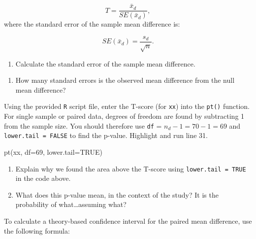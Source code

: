 \documentclass[
]{report}
\newenvironment{Shaded}{\begin{snugshade}}{\end{snugshade}}
\newcommand{\AttributeTok}[1]{\textcolor[rgb]{0.77,0.63,0.00}{#1}}
\newcommand{\ConstantTok}[1]{\textcolor[rgb]{0.00,0.00,0.00}{#1}}
\newcommand{\DecValTok}[1]{\textcolor[rgb]{0.00,0.00,0.81}{#1}}
\newcommand{\FunctionTok}[1]{\textcolor[rgb]{0.00,0.00,0.00}{#1}}
\newcommand{\NormalTok}[1]{#1}
\providecommand{\tightlist}{%
  \setlength{\itemsep}{0pt}\setlength{\parskip}{0pt}}
\begin{document}
\[T = \frac{\bar{x}_d}{SE(\bar{x}_d)},\]
\newpage
where the standard error of the sample mean difference is:

\[SE(\bar{x}_d)=\frac{s_d}{\sqrt{n}}.\]

\begin{enumerate}
\def\labelenumi{\arabic{enumi}.}
\setcounter{enumi}{6}
\tightlist
\item
  Calculate the standard error of the sample mean difference.
\end{enumerate}

\vspace{0.5in}

\begin{enumerate}
\def\labelenumi{\arabic{enumi}.}
\setcounter{enumi}{7}
\tightlist
\item
  How many standard errors is the observed mean difference from the null mean difference?
\end{enumerate}

\vspace{0.5in}

Using the provided \texttt{R} script file, enter the T-score (for \texttt{xx}) into the \texttt{pt()} function. For single sample or paired data, degrees of freedom are found by subtracting 1 from the sample size. You should therefore use \texttt{df} = \(n_d-1 = 70 - 1 = 69\) and \texttt{lower.tail\ =\ FALSE} to find the p-value. Highlight and run line 31.

\begin{Shaded}
\begin{Highlighting}[]
\FunctionTok{pt}\NormalTok{(xx, }\AttributeTok{df=}\DecValTok{69}\NormalTok{, }\AttributeTok{lower.tail=}\ConstantTok{TRUE}\NormalTok{)}
\end{Highlighting}
\end{Shaded}

\begin{enumerate}
\def\labelenumi{\arabic{enumi}.}
\setcounter{enumi}{8}
\item
  Explain why we found the area above the T-score using \texttt{lower.tail\ =\ TRUE} in the code above.
  \vspace{0.3in}
\item
  What does this p-value mean, in the context of the study? It is the probability of what\ldots assuming what?
  \vspace{0.8in}
\end{enumerate}

To calculate a theory-based confidence interval for the paired mean difference, use the following formula:
\end{document}

